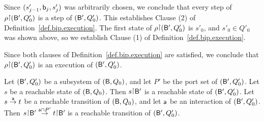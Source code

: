 {Since $(s'_{j-1}, \mathsf{b}_j, s'_j)$ was arbitrarily chosen, we conclude that
every step of $\rho \pj (\B', Q'_0)$  is a step of $(\mathsf{B}', Q'_0)$. This establishes Clause (2) of Definition~\ref{def.bip.execution}.
%
The first state of
$\rho \pj (\B', Q'_0)$  is $s'_0$, and $s'_0 \in Q'_0$ was shown above, so we establish Clause (1) of Definition~\ref{def.bip.execution}.

Since both clauses of Definition~\ref{def.bip.execution} are satisfied, we conclude that $\rho \pj (\B', Q'_0)$ is an execution of $(\mathsf{B}', Q'_0)$.
}%






\bco \label{cor.bip.reachability}
\label{cor:bip.reachability}
Let $(\mathsf{B}', Q'_0)$ be a subsystem of $(\mathsf{B}, Q_0)$, and let $P'$ be the port set of $(\mathsf{B}', Q'_0)$.
Let $s$ be a reachable state of $(\mathsf{B}, Q_0)$. Then $s \pj \B'$ is a reachable state of  $(\mathsf{B}',Q'_0)$. Let $s \stackrel{\mathsf{a}}{\rightarrow} t$ be
a reachable transition of $(\mathsf{B}, Q_0)$, and let $\mathsf{a}$ be an interaction of
 $(\mathsf{B}', Q'_0)$. Then  $s \pj \B' \la{\act \ints P'} t \pj \B'$ is a reachable transition of $(\mathsf{B}', Q'_0)$.
\eco
{}






